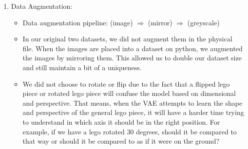 \documentclass[]{article}
\begin{document}
\begin{enumerate}
\begin{itemize}
\begin{figure}[h]
\begin{subfigure}[b]{0.25\textwidth}
                \caption{Computer Generated}
            \end{subfigure}\par\medskip
        \end{figure}
        \begin{itemize}
            \item Here are two examples of a photographed image (a) and a computer generated image (b). As you can see, the computer generated image is cleaner, has no background effects (shadow), and clearly represents the lego in the correct space at the correct angle at all times. We used both datasets in our VAE.
        \end{itemize}
    \end{itemize}
    \item Data Augmentation:
    \begin{itemize}
        \item Data augmentation pipeline: (image) $\Rightarrow$ (mirror) $\Rightarrow$ (greyscale)
        \item In our original two datasets, we did not augment them in the physical file. When the images are placed into a dataset on python, we augmented the images by mirroring them. This allowed us to double our dataset size and still maintain a bit of a uniqueness.
        \item We did not choose to rotate or flip due to the fact that a flipped lego piece or rotated lego piece will confuse the model based on dimensional and perspective. That means, when the VAE attempts to learn the shape and perspective of the general lego piece, it will have a harder time trying to understand in which axis it should be in the right position. For example, if we have a lego rotated 30 degrees, should it be compared to that way or should it be compared to as if it were on the ground?
    \end{itemize}
\end{enumerate}
\end{document}
